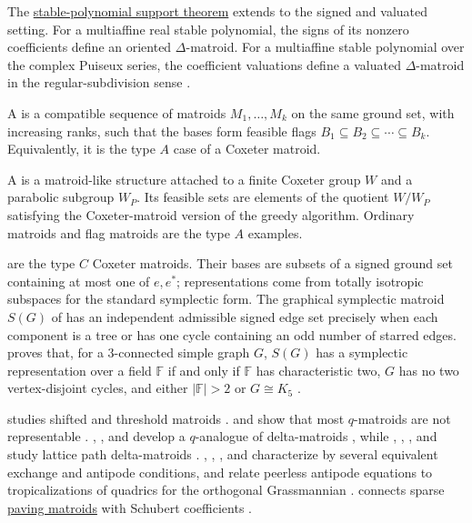 The \hyperref[stablePolynomial]{stable-polynomial support theorem} extends to
the signed and valuated setting.  For a multiaffine real stable polynomial,
the signs of its nonzero coefficients define an oriented
$\Delta$-matroid.  For a multiaffine stable polynomial over the complex
Puiseux series, the coefficient valuations define a valuated
$\Delta$-matroid in the regular-subdivision sense
\cite[Thms.~3.1 and~4.1]{Chin2026x}.

\begin{definition}\label{flagMatroid}
A  is a compatible sequence of matroids
$M_1,\dotsc,M_k$ on the same ground set, with increasing ranks, such that the
bases form feasible flags
$B_1\subseteq B_2\subseteq\dotsb\subseteq B_k$.  Equivalently, it is the type
$A$ case of a Coxeter matroid.
\end{definition}

\begin{definition}\label{coxeterMatroid}
A  is a matroid-like structure attached to a finite
Coxeter group $W$ and a parabolic subgroup $W_P$.  Its feasible sets are
elements of the quotient $W/W_P$ satisfying the Coxeter-matroid version of the
greedy algorithm.  Ordinary matroids and flag matroids are the type $A$
examples.
\end{definition}

 are the type $C$ Coxeter matroids. Their bases
are subsets of a signed ground set containing at most one of $e,e^*$;
representations come from totally isotropic subspaces for the standard
symplectic form. The graphical symplectic matroid $S(G)$ of
 has an independent admissible signed edge set
precisely when each component is a tree or
has one cycle containing an odd number of starred edges.
 proves that, for a $3$-connected simple graph $G$,
$S(G)$ has a symplectic representation over a field $\mathbb{F}$ if and only if
$\mathbb{F}$ has characteristic two, $G$ has no two vertex-disjoint cycles,
and either $|\mathbb{F}|>2$ or $G\cong K_5$
\cite[Thm.~6.11]{Ganguly2026x}.

 studies shifted and threshold matroids \cite{Partida2026}.
 and  show that most $q$-matroids are
not representable \cite{DegenKuhne2024x}.  ,
, and  develop a $q$-analogue of
delta-matroids \cite{CeriaJohnsenJurrius2024x}, while
, , , and
 study lattice path delta-matroids
\cite{ChenSanchezVelizYing2023x}.  ,
, , and 
characterize \label{strongDeltaMatroid} by
several equivalent exchange
and antipode conditions, and relate peerless antipode equations to
tropicalizations of quadrics for the orthogonal Grassmannian
\cite{CalvertDermenjianFinkSmith2026x}.   connects sparse
\hyperref[pavingMatroid]{paving matroids} with Schubert coefficients
\cite{Hamre2024x}.

